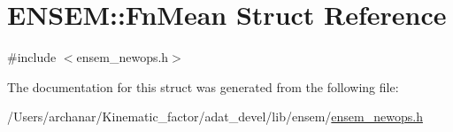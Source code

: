 \hypertarget{structENSEM_1_1FnMean}{}\section{E\+N\+S\+EM\+:\+:Fn\+Mean Struct Reference}
\label{structENSEM_1_1FnMean}


{\ttfamily \#include $<$ensem\+\_\+newops.\+h$>$}



The documentation for this struct was generated from the following file\+:\begin{DoxyCompactItemize}
\item 
/\+Users/archanar/\+Kinematic\+\_\+factor/adat\+\_\+devel/lib/ensem/\mbox{\hyperlink{lib_2ensem_2ensem__newops_8h}{ensem\+\_\+newops.\+h}}\end{DoxyCompactItemize}
